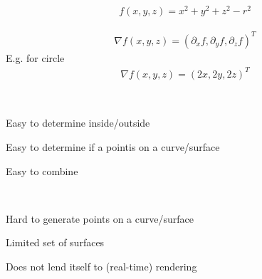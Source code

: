 \begin{compactdesc}
			\begin{gather*}
				f(x,y,z)=x^2+y^2+z^2-r^2
			\end{gather*}
		\item[\lp{Surface normal}]\mbox\\
			\begin{gather*}
				\nabla f(x,y,z)=(\partial_xf,\partial_yf,\partial_zf)^T
			\end{gather*}
			E.g. for circle
			\begin{gather*}
				\nabla f(x,y,z)=(2x,2y,2z)^T
			\end{gather*}
		\item[\lp{Advantages}]\hfill\\
			\begin{enumerate*}[label=\protect\circled{\arabic*},itemjoin=]
				\item Easy to determine inside/outside\\
				\item Easy to determine if a pointis on a curve/surface\\
				\item Easy to combine
			\end{enumerate*}
		\item[\lp{Disadvantages}]\hfill\\
			\begin{enumerate*}[label=\protect\circled{\arabic*},itemjoin=]
				\item Hard to generate points on a curve/surface\\
				\item Limited set of surfaces\\
				\item Does not  lend itself to (real-time) rendering
			\end{enumerate*}

\end{compactdesc}
